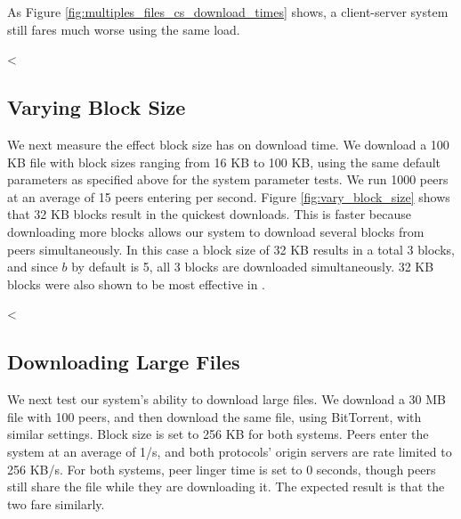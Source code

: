 As Figure \ref{fig:multiples_files_cs_download_times} shows, a client-server system still fares much worse using the same load.

<%

\subsection{Varying Block Size}

We next measure the effect block size has on download time. We download a 100 KB file with block sizes ranging from 
16 KB to 100 KB, using the same default parameters as specified above for the system parameter tests.
We run 1000 peers at an average of 15 peers entering per second. Figure \ref{fig:vary_block_size} shows that 32 KB blocks result
in the quickest downloads.  This is faster because downloading more blocks allows our system to download 
several blocks from peers simultaneously.  In this case a block size of 32 KB results in a total 3 blocks, and since $b$ by default is 5, all 3 blocks
are downloaded simultaneously. 32 KB blocks were also shown to be most effective in \cite{TODO}.  

<%

\subsection{Downloading Large Files}

We next test our system's ability to download large files. We download a 30 MB file with 100 peers, 
and then download the same file, using BitTorrent, with similar 
settings. Block size is set to 256 KB for both systems. Peers enter the system at an average of 1/s, 
and both protocols' origin servers are rate limited to 256 KB/s. For both systems, peer linger time 
is set to 0 seconds, though peers still share the file while they are downloading it. 
The expected result is that the two fare similarly. 

